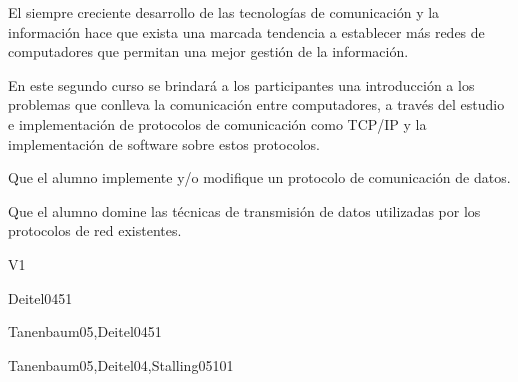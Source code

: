 \begin{syllabus}


\begin{justification}
El siempre creciente desarrollo de las tecnologías de comunicación y la
información hace que exista una marcada tendencia a  establecer
más redes de computadores que permitan una mejor
gestión de la información.

En este segundo curso se brindará a los participantes una introducción a los
problemas que conlleva la comunicación entre computadores, a través del
estudio e implementación de protocolos de comunicación como TCP/IP y
la implementación de software sobre estos protocolos.
\end{justification}

\begin{goals}
\item Que el alumno implemente y/o modifique un protocolo de comunicación de datos.
\item Que el alumno domine las técnicas de transmisión de datos utilizadas por los protocolos de red existentes.
\end{goals}

\begin{outcomes}{V1}
\end{outcomes}

\begin{unit}{\PFEventDrivenProgrammingDef}{}{Deitel04}{5}{1}
   \PFEventDrivenProgrammingAllTopics
   \begin{learningoutcomes}
      \item \PFEventDrivenProgrammingObjTWO
      \item \PFEventDrivenProgrammingObjTHREE
   \end{learningoutcomes}
\end{unit}

\begin{unit}{\NCNetworkSecurityDef}{}{Tanenbaum05,Deitel04}{5}{1}
        \NCNetworkSecurityAllTopics
        \NCNetworkSecurityAllObjectives
\end{unit}

\begin{unit}{\NCWebOrganizationDef}{}{Tanenbaum05,Deitel04,Stalling05}{10}{1}
        \NCWebOrganizationAllTopics
        \NCWebOrganizationAllObjectives
\end{unit}


\end{syllabus}
